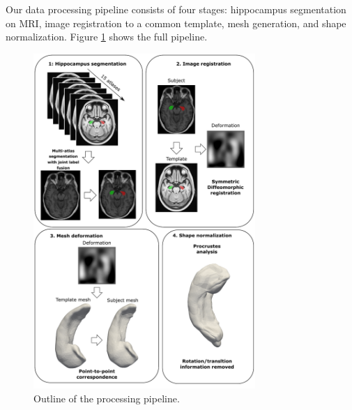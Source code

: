 Our data processing pipeline consists of four stages: hippocampus segmentation on MRI, image registration to a common template, mesh generation, and shape normalization. Figure \ref{fig:pipeline} shows the full pipeline.

\begin{figure}[htbp]
  \centering
  \includegraphics[width=0.75\textwidth]{figures/hippocampus/figure_pipeline.pdf}
  \caption{Outline of the processing pipeline.}\label{fig:pipeline}
\end{figure}

